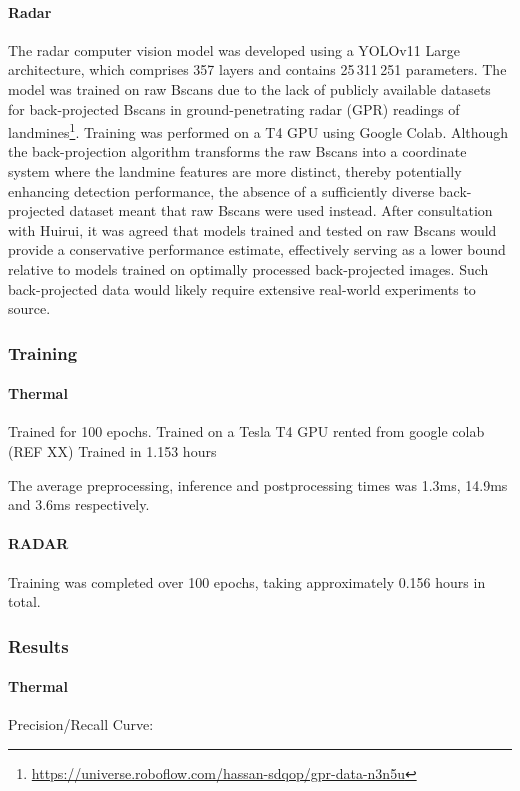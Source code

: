     \paragraph{Radar} The radar computer vision model was developed using a YOLOv11 Large architecture, which comprises 357 layers and contains 25\,311\,251 parameters. The model was trained on raw Bscans due to the lack of publicly available datasets for back-projected Bscans in ground-penetrating radar (GPR) readings of landmines\footnote{\url{https://universe.roboflow.com/hassan-sdqop/gpr-data-n3n5u}}. Training was performed on a T4 GPU using Google Colab. Although the back-projection algorithm transforms the raw Bscans into a coordinate system where the landmine features are more distinct, thereby potentially enhancing detection performance, the absence of a sufficiently diverse back-projected dataset meant that raw Bscans were used instead. After consultation with Huirui, it was agreed that models trained and tested on raw Bscans would provide a conservative performance estimate, effectively serving as a lower bound relative to models trained on optimally processed back-projected images. Such back-projected data would likely require extensive real-world experiments to source.

\subsubsection{Training}

    \paragraph{Thermal} Trained for 100 epochs.
    Trained on a Tesla T4 GPU rented from google colab (REF XX)
    Trained in 1.153 hours

    The average preprocessing, inference and postprocessing times was 1.3ms, 14.9ms and 3.6ms respectively.
    
    \paragraph{RADAR} Training was completed over 100 epochs, taking approximately 0.156 hours in total. 

\subsubsection{Results}

    \paragraph{Thermal}     Precision/Recall Curve: 
    
